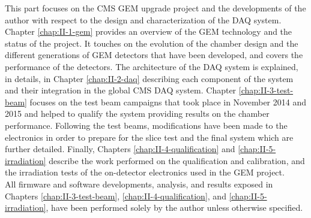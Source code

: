 This part focuses on the CMS GEM upgrade project and the developments of the author with respect to the design and characterization of the DAQ system. Chapter \ref{chap:II-1-gem} provides an overview of the GEM technology and the status of the project. It touches on the evolution of the chamber design and the different generations of GEM detectors that have been developed, and covers the performance of the detectors. The architecture of the DAQ system is explained, in details, in Chapter \ref{chap:II-2-daq} describing each component of the system and their integration in the global CMS DAQ system. Chapter \ref{chap:II-3-test-beam} focuses on the test beam campaigns that took place in November 2014 and 2015 and helped to qualify the system providing results on the chamber performance. Following the test beams, modifications have been made to the electronics in order to prepare for the slice test and the final system which are further detailed. Finally, Chapters \ref{chap:II-4-qualification} and \ref{chap:II-5-irradiation} describe the work performed on the qualification and calibration, and the irradiation tests of the on-detector electronics used in the GEM project. \\

All firmware and software developments, analysis, and results exposed in Chapters \ref{chap:II-3-test-beam}, \ref{chap:II-4-qualification}, and \ref{chap:II-5-irradiation}, have been performed solely by the author unless otherwise specified.
